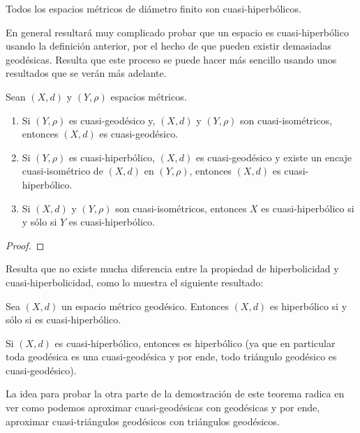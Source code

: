 \documentclass[12pt]{report}
\theoremstyle{largebreak}
\begin{document}
    \begin{exa}
        Todos los espacios métricos de diámetro finito son cuasi-hiperbólicos.
    \end{exa}

    \begin{obs}
        En general resultará muy complicado probar que un espacio es cuasi-hiperbólico usando la definición anterior, por el hecho de que pueden existir demasiadas geodésicas. Resulta que este proceso se puede hacer más sencillo usando unos resultados que se verán más adelante.
    \end{obs}

    \begin{propo}
        Sean $(X,d)$ y $(Y,\rho)$ espacios métricos.
        \begin{enumerate}[label = \textit{(\arabic*)}]
            \item Si $(Y,\rho)$ es cuasi-geodésico y, $(X,d)$ y $(Y,\rho)$ son cuasi-isométricos, entonces $(X,d)$ es cuasi-geodésico.
            \item Si $(Y,\rho)$ es cuasi-hiperbólico, $(X,d)$ es cuasi-geodésico y existe un encaje cuasi-isométrico de $(X,d)$ en $(Y,\rho)$, entonces $(X,d)$ es cuasi-hiperbólico.
            \item Si $(X,d)$ y $(Y,\rho)$ son cuasi-isométricos, entonces $X$ es cuasi-hiperbólico si y sólo si $Y$ es cuasi-hiperbólico.
        \end{enumerate}
    \end{propo}

    \begin{proof}
    \end{proof}

    Resulta que no existe mucha diferencia entre la propiedad de hiperbolicidad y cuasi-hiperbolicidad, como lo muestra el siguiente resultado:

    \begin{theor}
        Sea $(X,d)$ un espacio métrico geodésico. Entonces $(X,d)$ es hiperbólico si y sólo si es cuasi-hiperbólico.
    \end{theor}

    Si $(X,d)$ es cuasi-hiperbólico, entonces es hiperbólico (ya que en particular toda geodésica es una cuasi-geodésica y por ende, todo triángulo geodésico es cuasi-geodésico).

    La idea para probar la otra parte de la demostración de este teorema radica en ver como podemos aproximar cuasi-geodésicas con geodésicas y por ende, aproximar cuasi-triángulos geodésicos con triángulos geodésicos.
\end{document}
